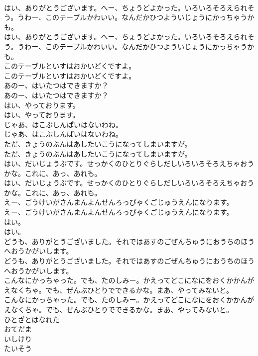 \documentclass[8pt]{extreport}
\begin{document}
\begin{CJK}{UTF8}{min}
\\	はい、ありがとうございます。へー、ちょうどよかった。いろいろそろえられそう。うわー、このテーブルかわいい。なんだかひつよういじょうにかっちゃうかも。　　
\\	はい、ありがとうございます。へー、ちょうどよかった。いろいろそろえられそう。うわー、このテーブルかわいい。なんだかひつよういじょうにかっちゃうかも。　　
\\	このテーブルといすはおかいどくですよ。
\\	このテーブルといすはおかいどくですよ。
\\	あのー、はいたつはできますか？
\\	あのー、はいたつはできますか？
\\	はい、やっております。
\\	はい、やっております。
\\	じゃあ、はこぶしんぱいはないわね。
\\	じゃあ、はこぶしんぱいはないわね。
\\	ただ、きょうのぶんはあしたいこうになってしまいますが。
\\	ただ、きょうのぶんはあしたいこうになってしまいますが。
\\	はい、だいじょうぶです。せっかくのひとりぐらしだしいろいろそろえちゃおうかな。これに、あっ、あれも。
\\	はい、だいじょうぶです。せっかくのひとりぐらしだしいろいろそろえちゃおうかな。これに、あっ、あれも。
\\	えー、ごうけいがさんまんよんせんろっぴゃくごじゅうえんになります。
\\	えー、ごうけいがさんまんよんせんろっぴゃくごじゅうえんになります。
\\	はい。
\\	はい。
\\	どうも、ありがとうございました。それではあすのごぜんちゅうにおうちのほうへおうかがいします。
\\	どうも、ありがとうございました。それではあすのごぜんちゅうにおうちのほうへおうかがいします。
\\	こんなにかっちゃった。でも、たのしみー。かえってどこになにをおくかかんがえなくちゃ。でも、ぜんぶひとりでできるかな。まあ、やってみないと。
\\	こんなにかっちゃった。でも、たのしみー。かえってどこになにをおくかかんがえなくちゃ。でも、ぜんぶひとりでできるかな。まあ、やってみないと。
\\	ひとざとはなれた
\\	おてだま
\\	いしけり
\\	たいそう

\end{CJK}
\end{document}
